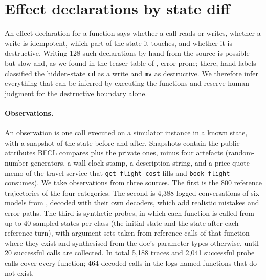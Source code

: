 \documentclass{article}
\newcommand{\cls}[1]{\texttt{#1}}
\begin{document}
\section{Effect declarations by state diff}
\label{sec:effects}

An effect declaration for a function says whether a call reads or writes, whether a write is idempotent, which part of
the state it touches, and whether it is destructive. Writing 128 such declarations by hand from the source is possible but
slow and, as we found in the teaser table of \citet{kovalenko2026effectworld}, error-prone; there, hand labels classified
the hidden-state \cls{cd} as a write and \cls{mv} as destructive. We therefore infer everything that can be inferred by
executing the functions and reserve human judgment for the destructive boundary alone.

\paragraph{Observations.} An observation is one call executed on a simulator instance in a known state, with a snapshot of
the state before and after. Snapshots contain the public attributes BFCL compares plus the private ones, minus four
artefacts (random-number generators, a wall-clock stamp, a description string, and a price-quote memo of the travel
service that \cls{get\_flight\_cost} fills and \cls{book\_flight} consumes). We take observations from three sources.
The first is the 800 reference trajectories of the four categories. The second is 4,388 logged conversations of six
models from \citet{kovalenko2026effectworld}, decoded with their own decoders, which add realistic mistakes and error
paths. The third is synthetic probes, in which each function is called from up to 40 sampled states per class (the
initial state and the state after each reference turn), with argument sets taken from reference calls of that function
where they exist and synthesised from the doc's parameter types otherwise, until 20 successful calls are collected. In
total 5,188 traces and 2,041 successful probe calls cover every function; 464 decoded calls in the logs named functions
that do not exist.
\end{document}
